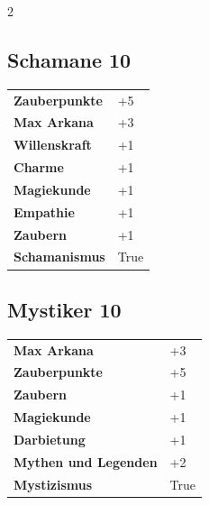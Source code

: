 \begin{multicols}{2}
\begin{tcolorbox}

\end{tcolorbox}

\begin{tcolorbox}
    \subsection*{Schamane \hfill \small{10 }}
    \tcblower




\begin{tabular}{@{}ll@{}}
    \textbf{Zauberpunkte} & +5\\
    \textbf{Max Arkana} & +3\\
    \textbf{Willenskraft} & +1\\
    \textbf{Charme} & +1\\
    \textbf{Magiekunde} & +1\\
    \textbf{Empathie} & +1\\
    \textbf{Zaubern} & +1\\
    \textbf{Schamanismus} & True\\
\end{tabular}


\end{tcolorbox}

\begin{tcolorbox}
    \subsection*{Mystiker \hfill \small{10 }}
    \tcblower




\begin{tabular}{@{}ll@{}}
    \textbf{Max Arkana} & +3\\
    \textbf{Zauberpunkte} & +5\\
    \textbf{Zaubern} & +1\\
    \textbf{Magiekunde} & +1\\
    \textbf{Darbietung} & +1\\
    \textbf{Mythen und Legenden} & +2\\
    \textbf{Mystizismus} & True\\
\end{tabular}


\end{tcolorbox}
\end{multicols}
